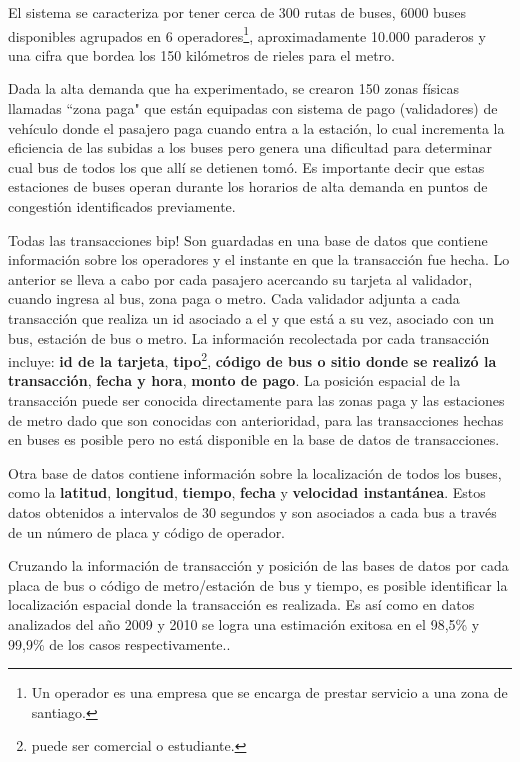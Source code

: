 \documentclass[12pt]{article}
\begin{document}

El sistema se caracteriza por tener cerca de 300 rutas de buses, 6000 buses disponibles agrupados en 6 operadores\footnote{Un operador es una empresa que se encarga de prestar servicio a una zona de santiago.}, aproximadamente 10.000 paraderos y una cifra que bordea los 150 kilómetros de rieles para el metro. 

Dada la alta demanda que ha experimentado, se crearon 150 zonas físicas llamadas ``zona paga" que están equipadas con sistema de pago (validadores) de vehículo donde el pasajero paga cuando entra a la estación, lo cual incrementa la eficiencia de las subidas a los buses pero genera una dificultad para determinar cual bus de todos los que allí se detienen tomó. Es importante decir que estas estaciones de buses operan durante los horarios de alta demanda en puntos de congestión identificados previamente.

Todas las transacciones bip! Son guardadas en una base de datos que contiene información sobre los operadores y el instante en que la transacción fue hecha. Lo anterior se lleva a cabo por cada pasajero acercando su tarjeta al validador, cuando ingresa al bus, zona paga o metro. Cada validador adjunta a cada transacción que realiza un id asociado a el y que está a su vez, asociado con un bus, estación de bus o metro. La información recolectada por cada transacción incluye: \textbf{id de la tarjeta}, \textbf{tipo}\footnote{puede ser comercial o estudiante.},  \textbf{código de bus o sitio donde se realizó la transacción}, \textbf{fecha y hora}, \textbf{monto de pago}. La posición espacial de la transacción puede ser conocida directamente para las zonas paga y las estaciones de metro dado que son conocidas con anterioridad, para las transacciones hechas en buses es posible pero no está disponible en la base de datos de transacciones.


Otra base de datos contiene información sobre la localización de todos los buses, como la \textbf{latitud}, \textbf{longitud}, \textbf{tiempo}, \textbf{fecha} y \textbf{velocidad instantánea}. Estos datos obtenidos a intervalos de 30 segundos y son asociados a cada bus a través de un número de placa y código de operador.

Cruzando la información de transacción y posición de las bases de datos por cada placa de bus o código de metro/estación de bus y tiempo, es posible identificar la localización espacial donde la transacción es realizada. Es así como en datos analizados del año 2009 y 2010 se logra una estimación exitosa en el 98,5\% y 99,9\% de los casos respectivamente.\cite{Procesamiento_datos}.
\end{document}
